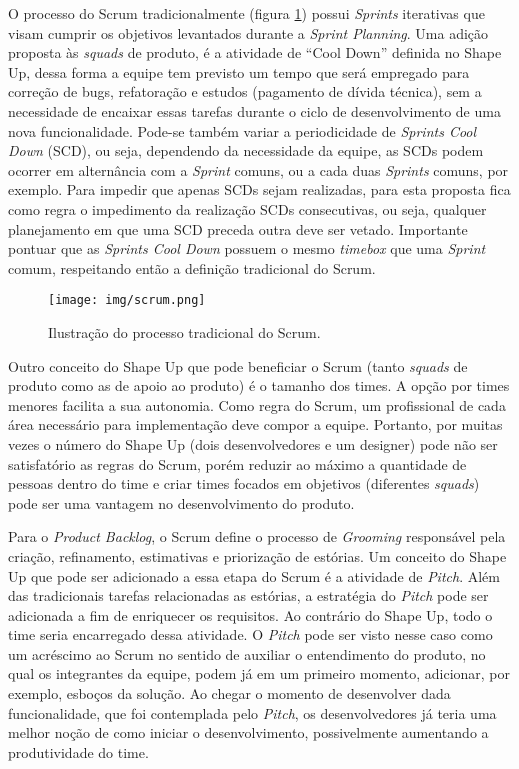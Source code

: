 \documentclass[12pt]{article}
\begin{document}
O processo do Scrum tradicionalmente (figura \ref{fig:scrum}) possui \textit{Sprints} iterativas que visam cumprir os objetivos levantados durante a \textit{Sprint Planning}. Uma adição proposta às \textit{squads} de produto, é a atividade de ``Cool Down'' definida no Shape Up, dessa forma a equipe tem previsto um tempo que será empregado para correção de bugs, refatoração e estudos (pagamento de dívida técnica), sem a necessidade de encaixar essas tarefas durante o ciclo de desenvolvimento de uma nova funcionalidade. Pode-se também variar a periodicidade de \textit{Sprints Cool Down} (SCD), ou seja, dependendo da necessidade da equipe, as SCDs podem ocorrer em alternância com a \textit{Sprint} comuns, ou a cada duas \textit{Sprints} comuns, por exemplo. Para impedir que apenas SCDs sejam realizadas, para esta proposta fica como regra o impedimento da realização SCDs consecutivas, ou seja, qualquer planejamento em que uma SCD preceda outra deve ser vetado. Importante pontuar que as \textit{Sprints Cool Down} possuem o mesmo \textit{timebox} que uma \textit{Sprint} comum, respeitando então a definição tradicional do Scrum. 

\begin{figure}[ht]
    \centering
    \texttt{[image: img/scrum.png]}
    \caption{Ilustração do processo tradicional do Scrum.}
    \label{fig:scrum}
\end{figure}

Outro conceito do Shape Up que pode beneficiar o Scrum (tanto \textit{squads} de produto como as de apoio ao produto) é o tamanho dos times. A opção por times menores facilita a sua autonomia. Como regra do Scrum, um profissional de cada área necessário para implementação deve compor a equipe. Portanto, por muitas vezes o número do Shape Up (dois desenvolvedores e um designer) pode não ser satisfatório as regras do Scrum, porém reduzir ao máximo a quantidade de pessoas dentro do time e criar times focados em objetivos (diferentes \textit{squads}) pode ser uma vantagem no desenvolvimento do produto.

Para o \textit{Product Backlog}, o Scrum define o processo de \textit{Grooming} responsável pela criação, refinamento, estimativas e priorização de estórias. Um conceito do Shape Up que pode ser adicionado a essa etapa do Scrum é a atividade de \textit{Pitch}. Além das tradicionais tarefas relacionadas as estórias, a estratégia do \textit{Pitch} pode ser adicionada a fim de enriquecer os requisitos. Ao contrário do Shape Up, todo o time seria encarregado dessa atividade. O \textit{Pitch} pode ser visto nesse caso como um acréscimo ao Scrum no sentido de auxiliar o entendimento do produto, no qual os integrantes da equipe, podem já em um primeiro momento, adicionar, por exemplo, esboços da solução. Ao chegar o momento de desenvolver dada funcionalidade, que foi contemplada pelo \textit{Pitch}, os desenvolvedores já teria uma melhor noção de como iniciar o desenvolvimento, possivelmente aumentando a produtividade do time.
\end{document}
